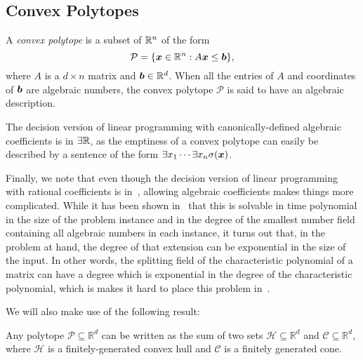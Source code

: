 \subsection{Convex Polytopes}

A \emph{convex polytope} is a subset of $\mathbb{R}^{n}$ of the form
\begin{equation*}
\mathcal{P} = \lbrace \boldsymbol{x} \in \mathbb{R}^{n} : A \boldsymbol{x} \leq \boldsymbol{b} \rbrace ,
\end{equation*}
where $A$ is a $d \times n$ matrix and $\boldsymbol{b} \in \mathbb{R}^{d}$. When all the entries of $A$ and coordinates of $\boldsymbol{b}$ are algebraic numbers, the convex polytope $\mathcal{P}$ is said to have an algebraic description.

The decision version of linear programming with canonically-defined algebraic coefficients is in $\exists\mathbb{R}$, as the emptiness of a convex polytope can easily be described by a sentence of the form $\exists x_1 \cdots \exists x_n \sigma(\boldsymbol{x})$.

Finally, we note that even though the decision version of linear
programming with rational coefficients is in~\PTIME{}, allowing
algebraic coefficients makes things more complicated. While it has
been shown in~\cite{AdlerB94} that this is solvable in time polynomial
in the size of the problem instance and in the degree of the smallest
number field containing all algebraic numbers in each instance, it
turns out that, in the problem at hand, the degree of that extension can
be exponential in the size of the input. In other words, the splitting
field of the characteristic polynomial of a matrix can have a degree
which is exponential in the degree of the characteristic polynomial, which is makes it hard to place this problem in~\PTIME{}.

We will also make use of the following result:
\begin{theorem}
  Any polytope $\mathcal{P} \subseteq \mathbb{R}^{d}$ can be written as the sum of two sets $\mathcal{H} \subseteq \mathbb{R}^{d}$ and $\mathcal{C} \subseteq \mathbb{R}^{d}$, where $\mathcal{H}$ is a finitely-generated convex hull and $\mathcal{C}$ is a finitely generated cone.
\end{theorem}
